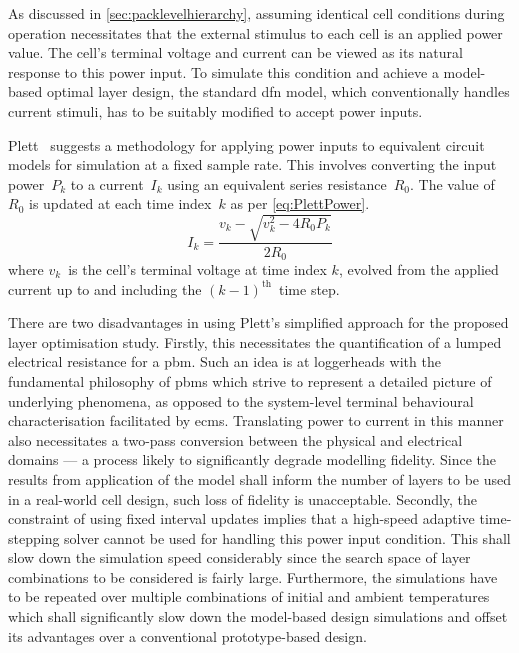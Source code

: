 As   discussed  in   \cref{sec:packlevelhierarchy},   assuming  identical   cell
conditions during operation necessitates that the external stimulus to each cell
is an applied power value. The cell's terminal voltage and current can be viewed
as its  natural response  to this  power input. To  simulate this  condition and
achieve a model-based optimal layer  design, the standard \gls{dfn} model, which
conventionally handles  current stimuli, has  to be suitably modified  to accept
power inputs.

Plett~\cite{Plett2016}  suggests  a methodology  for  applying  power inputs  to
equivalent circuit models  for simulation at a fixed sample  rate. This involves
converting the input  power~$P_k$ to a current~$I_k$ using  an equivalent series
resistance~$R_0$. The  value of~$R_0$ is  updated at each time  index~$k$ as per
\cref{eq:PlettPower}.
\begin{equation}\label{eq:PlettPower}
    I_k = \frac{v_k - \sqrt{v^\text{2}_k - 4R_0P_{k}}}{2R_0}
\end{equation}
where $v_k$~is the  cell's terminal voltage at time index  $k$, evolved from the
applied current up to and including the $(k-1)^\text{th}$~time step.

There  are  two disadvantages  in  using  Plett's  simplified approach  for  the
proposed layer optimisation study. Firstly, this necessitates the quantification
of  a  lumped  electrical  resistance  for  a \gls{pbm}.  Such  an  idea  is  at
loggerheads  with the  fundamental  philosophy of  \glspl{pbm}  which strive  to
represent  a  detailed  picture  of  underlying phenomena,  as  opposed  to  the
system-level terminal  behavioural characterisation facilitated  by \glspl{ecm}.
Translating  power  to current  in  this  manner  also necessitates  a  two-pass
conversion between the  physical and electrical domains --- a  process likely to
significantly degrade modelling fidelity. Since  the results from application of
the model  shall inform the  number of  layers to be  used in a  real-world cell
design, such loss of fidelity is unacceptable. Secondly, the constraint of using
fixed interval updates  implies that a high-speed  adaptive time-stepping solver
cannot be used for handling this power input condition. This shall slow down the
simulation speed considerably since the search space of layer combinations to be
considered is  fairly large.  Furthermore, the simulations  have to  be repeated
over  multiple combinations  of  initial and  ambient  temperatures which  shall
significantly  slow  down the  model-based  design  simulations and  offset  its
advantages over a conventional prototype-based design.

